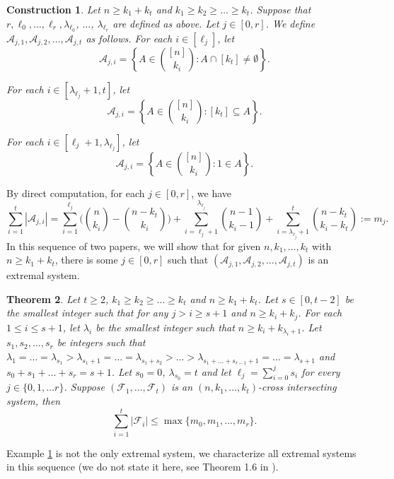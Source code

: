 \documentclass[a4paper,11pt]{article}
\newtheorem{theorem}{Theorem}[section]
\newtheorem{construction}[theorem]{Construction}
\begin{document}
\begin{construction}\label{cons1}
Let $n\geq k_1+k_t$ and $k_1\geq k_2\geq \dots \geq k_t$. Suppose that $r, \ell_0, \dots, \ell_r, \lambda_{\ell_0}$, $\dots$, $\lambda_{\ell_r}$ are defined as above.
Let $j\in [0, r]$.  We define $\mathcal{A}_{j,1}, \mathcal{A}_{j, 2}, \dots, \mathcal{A}_{j, t}$ as follows.
For each $i\in [\ell_j]$, let
\[
\mathcal{A}_{j,i}=\left\{ A\in {[n]\choose k_i}: A\cap [k_t]\ne \emptyset       \right\}.
\]

For each $i\in [\lambda_{\ell_j}+1, t]$, let
\[
\mathcal{A}_{j,i}=\left\{ A\in {[n]\choose k_i}: [k_t]\subseteq A \right\}.
\]

For each $i\in [\ell_j+1, \lambda_{\ell_j}]$, let
\[
\mathcal{A}_{j,i}=\left\{ A\in {[n]\choose k_i}: 1 \in A \right\}.
\]
\end{construction}
By direct computation, for each $j\in [0, r]$, we have
$$\sum_{i=1}^t|\mathcal{A}_{j, i}|=\sum_{i=1}^{\ell_j} \bigg({n\choose k_i}-{n-k_t\choose k_i}\bigg) + \sum_{i=\ell_j+1}^{\lambda_{\ell_j}}{n-1\choose k_i-1} + \sum_{i=\lambda_{\ell_j}+1}^t  {n-k_t\choose k_i-k_t}:=m_j.$$
In this sequence of two papers, we will show that for given $n, k_1, \dots, k_t$ with $n\geq k_1+k_t$, there is some $j\in [0, r]$ such that $(\mathcal{A}_{j,1}, \mathcal{A}_{j, 2}, \dots, \mathcal{A}_{j, t})$ is an extremal system.


\begin{theorem}\label{main3}
Let $t\geq 2$, $k_1\geq k_2\geq \dots\geq k_t$  and $n\geq k_1+k_t$.
Let $s\in [0, t-2]$ be the smallest integer such that for any $j>i\geq s+1$ and $n\geq k_i+k_j$.  For each $1\leq i \leq s+1$, let $\lambda_i$ be the smallest integer such that $n\geq k_i+k_{\lambda_i+1}$.
 Let $s_1, s_2, \dots, s_r$ be integers such that
$\lambda_1=\dots=\lambda_{s_1}>\lambda_{s_1+1}=\dots=\lambda_{s_1+s_2}>\dots>\lambda_{s_1+\dots+s_{r-1}+1}=\dots=\lambda_{s+1}$ and $s_0+s_1+ \dots+s_r=s+1$.
 Let $s_0=0$, $\lambda_{s_0}=t$ and let $\ell_j=\sum_{i=0}^j s_i$ for every $j\in \{0, 1, \dots r\}$. Suppose $(\mathcal{F}_1, \dots, \mathcal{F}_t)$ is an $(n, k_1, \dots, k_t)$-cross intersecting system, then
\begin{equation*}
\sum_{i=1}^t|\mathcal{F}_i|\leq \max \{ m_0, m_1, \dots, m_r\}.
\end{equation*}
\end{theorem}
Example \ref{cons1} is not the only extremal system,  we  characterize all extremal systems in this sequence (we do not state it here, see Theorem 1.6 in \cite{hpgeneral}).
\end{document}
